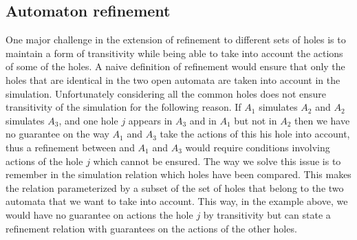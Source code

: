 \documentclass[runningheads]{llncs}
\begin{document}
\subsection{Automaton refinement}

One major challenge in the extension of refinement to different sets of holes is to maintain a form of transitivity while being able to take into account the actions of some of the holes. A naive definition of refinement would ensure that only the holes that are identical in the two open automata are taken into account in the simulation. Unfortunately considering all the common holes does not ensure transitivity of the simulation for the following reason. If $A_1$ simulates $A_2$ and $A_2$ simulates $A_3$, and one hole $j$ appears in $A_3$ and in $A_1$ but not in $A_2$ then we have no guarantee on the way $A_1$ and $A_3$ take the actions of this his hole into account, thus  a refinement between and $A_1$ and $A_3$ would require conditions involving actions of the hole $j$ which cannot be ensured. The way we solve this issue is to remember in the simulation relation which holes have been compared. This makes the relation parameterized by a subset of the set of holes that belong to the two automata that we want to take into account.
This way, in the example above, we would have no guarantee on actions the hole $j$ by transitivity but can state a refinement relation with guarantees on the actions of the other holes.
\end{document}
